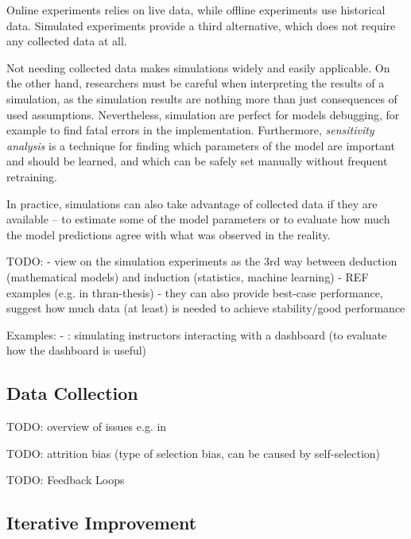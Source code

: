Online experiments relies on live data,
while offline experiments use historical data.
Simulated experiments provide a third alternative,
  which does not require any collected data at all.

Not needing collected data makes simulations widely and easily applicable.
On the other hand, researchers must be careful when interpreting
  the results of a simulation, as the simulation results are nothing more than
  just consequences of used assumptions.
Nevertheless, simulation are perfect for models debugging,
  for example to find fatal errors in the implementation.
Furthermore, \emph{sensitivity analysis} is a technique for finding
  which parameters of the model are important and should be learned,
  and which can be safely set manually without frequent retraining.

In practice, simulations can also take advantage of collected data
  if they are available -- to estimate some of the model parameters
  or to evaluate how much the model predictions agree with
  what was observed in the reality.


TODO:
- view on the simulation experiments as the 3rd way between deduction (mathematical models) and induction (statistics, machine learning)
- REF examples (e.g. in thran-thesis)
- they can also provide best-case performance, suggest how much data (at least) is needed to achieve stability/good performance


Examples:
- \cite{instructor-dashboard-realtime}:
 simulating instructors interacting with a dashboard (to evaluate how the dashboard is useful)


\subsection{Data Collection}

TODO: overview of issues e.g. in \cite{pelanek-learner-modeling}

TODO: attrition bias (type of selection bias, can be caused by self-selection)

TODO: Feedback Loops


\subsection{Iterative Improvement}
\label{sec:iterative-improvement}

